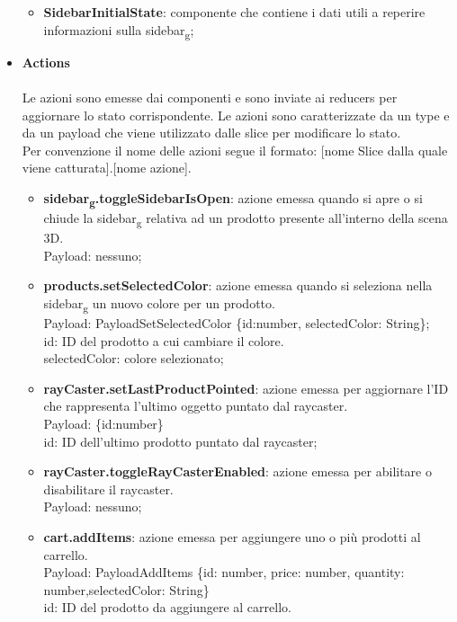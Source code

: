 \begin{itemize}
\begin{itemize}
			\item \textbf{SidebarInitialState}: componente che contiene i dati utili a reperire informazioni sulla sidebar\textsubscript{g};
		\end{itemize}
		\item \textbf{\large Actions}
		\\\\
		Le azioni sono emesse dai componenti e sono inviate ai reducers per aggiornare lo stato corrispondente.
		Le azioni sono caratterizzate da un type e da un payload che viene utilizzato dalle slice per modificare lo stato.
		\\
		Per convenzione il nome delle azioni segue il formato: [nome Slice dalla quale viene catturata].[nome azione].
		\begin{itemize}
			\item \textbf{sidebar\textsubscript{g}.toggleSidebarIsOpen}: azione emessa quando si apre o si chiude la sidebar\textsubscript{g} relativa ad un prodotto presente 
			all'interno della scena 3D.
			\\
			Payload: nessuno;
			\item \textbf{products.setSelectedColor}: azione emessa quando si seleziona nella sidebar\textsubscript{g} un nuovo colore per un prodotto.
			\\
			Payload: PayloadSetSelectedColor \{id:number, selectedColor: String\};
			\\
			id: ID del prodotto a cui cambiare il colore.
			\\
			selectedColor: colore selezionato;
			\item \textbf{rayCaster.setLastProductPointed}: azione emessa per aggiornare l'ID che rappresenta l'ultimo oggetto puntato dal raycaster.
			\\
			Payload: \{id:number\}
			\\
			id: ID dell'ultimo prodotto puntato dal raycaster;
			\item \textbf{rayCaster.toggleRayCasterEnabled}: azione emessa per abilitare o disabilitare il raycaster.
			\\
			Payload: nessuno;
			\item \textbf{cart.addItems}: azione emessa per aggiungere uno o più prodotti al carrello.
			\\
			Payload: PayloadAddItems \{id: number, price: number, quantity: number,selectedColor: String\}
			\\
			id: ID del prodotto da aggiungere al carrello.
			\\

\end{itemize}
\end{itemize}

